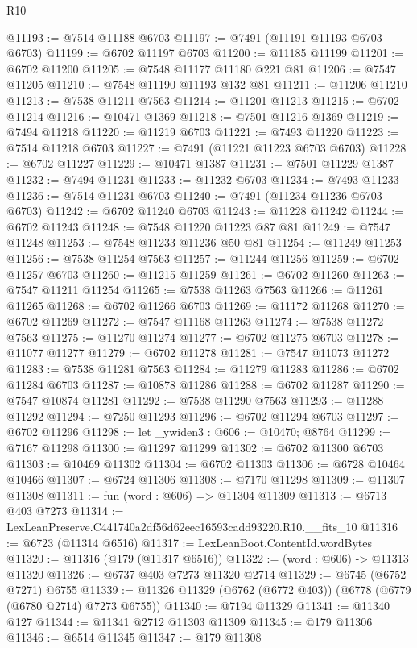 \begin{lexlean}{R10}
\begin{coremodule}
@11193 := @7514 @11188 @6703
@11197 := @7491 (@11191 @11193 @6703 @6703)
@11199 := @6702 @11197 @6703
@11200 := @11185 @11199
@11201 := @6702 @11200
@11205 := @7548 @11177 @11180 @221 @81
@11206 := @7547 @11205
@11210 := @7548 @11190 @11193 @132 @81
@11211 := @11206 @11210
@11213 := @7538 @11211 @7563
@11214 := @11201 @11213
@11215 := @6702 @11214
@11216 := @10471 @1369
@11218 := @7501 @11216 @1369
@11219 := @7494 @11218
@11220 := @11219 @6703
@11221 := @7493 @11220
@11223 := @7514 @11218 @6703
@11227 := @7491 (@11221 @11223 @6703 @6703)
@11228 := @6702 @11227
@11229 := @10471 @1387
@11231 := @7501 @11229 @1387
@11232 := @7494 @11231
@11233 := @11232 @6703
@11234 := @7493 @11233
@11236 := @7514 @11231 @6703
@11240 := @7491 (@11234 @11236 @6703 @6703)
@11242 := @6702 @11240 @6703
@11243 := @11228 @11242
@11244 := @6702 @11243
@11248 := @7548 @11220 @11223 @87 @81
@11249 := @7547 @11248
@11253 := @7548 @11233 @11236 @50 @81
@11254 := @11249 @11253
@11256 := @7538 @11254 @7563
@11257 := @11244 @11256
@11259 := @6702 @11257 @6703
@11260 := @11215 @11259
@11261 := @6702 @11260
@11263 := @7547 @11211 @11254
@11265 := @7538 @11263 @7563
@11266 := @11261 @11265
@11268 := @6702 @11266 @6703
@11269 := @11172 @11268
@11270 := @6702 @11269
@11272 := @7547 @11168 @11263
@11274 := @7538 @11272 @7563
@11275 := @11270 @11274
@11277 := @6702 @11275 @6703
@11278 := @11077 @11277
@11279 := @6702 @11278
@11281 := @7547 @11073 @11272
@11283 := @7538 @11281 @7563
@11284 := @11279 @11283
@11286 := @6702 @11284 @6703
@11287 := @10878 @11286
@11288 := @6702 @11287
@11290 := @7547 @10874 @11281
@11292 := @7538 @11290 @7563
@11293 := @11288 @11292
@11294 := @7250 @11293
@11296 := @6702 @11294 @6703
@11297 := @6702 @11296
@11298 := let _ywiden3 : @606 := @10470; @8764
@11299 := @7167 @11298
@11300 := @11297 @11299
@11302 := @6702 @11300 @6703
@11303 := @10469 @11302
@11304 := @6702 @11303
@11306 := @6728 @10464 @10466
@11307 := @6724 @11306
@11308 := @7170 @11298
@11309 := @11307 @11308
@11311 := fun (word : @606) => @11304 @11309
@11313 := @6713 @403 @7273
@11314 := LexLeanPreserve.C441740a2df56d62eec16593cadd93220.R10.__fits_10
@11316 := @6723 (@11314 @6516)
@11317 := LexLeanBoot.ContentId.wordBytes
@11320 := @11316 (@179 (@11317 @6516))
@11322 := (word : @606) -> @11313 @11320
@11326 := @6737 @403 @7273 @11320 @2714
@11329 := @6745 (@6752 @7271) @6755
@11339 := @11326 @11329 (@6762 (@6772 @403)) (@6778 (@6779 (@6780 @2714) @7273 @6755))
@11340 := @7194 @11329
@11341 := @11340 @127
@11344 := @11341 @2712 @11303 @11309
@11345 := @179 @11306
@11346 := @6514 @11345
@11347 := @179 @11308

\end{coremodule}
\end{lexlean}
